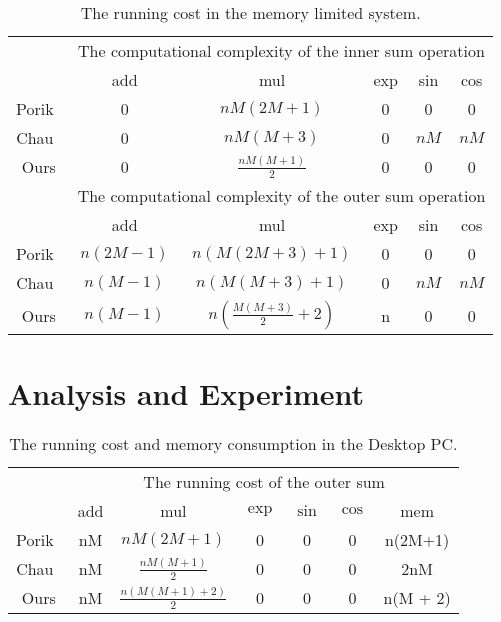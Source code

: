 \documentclass[twocolumn]{el-author}
\begin{document}
\begin{table}[t]
\caption{The running cost in the memory limited system.}
\begin{tabular}{|c|c|c|c|c|c|}
\hline
\multirow{2}{*}{} & \multicolumn{5}{c|}{The computational complexity of the inner sum operation} \\ \cline{2-6}
                  & add            & mul                         & exp     & sin      & cos      \\ \hline
Porik~\cite{Porikli_CVPR_2008}           & 0              & $nM(2M + 1)$                & 0       & 0        & 0        \\ \hline
Chau~\cite{Chaudhury_TIP_2011}         & 0              & $nM(M + 3)$                 & 0       & $nM$     & $nM$     \\ \hline
Ours              & 0              & $\frac{n M (M+1)}{2}$       & 0       & 0        & 0        \\ \hline
\multirow{2}{*}{} & \multicolumn{5}{c|}{The computational complexity of the outer sum operation} \\ \cline{2-6}
                  & add            & mul                         & exp     & sin      & cos      \\ \hline
Porik~\cite{Porikli_CVPR_2008}           & $n(2M-1)$      & $n(M(2M+3)+1)$              & 0       & 0        & 0        \\ \hline
Chau~\cite{Chaudhury_TIP_2011}        & $n(M-1)$       & $n(M(M+3)+1)$               & 0       & $nM$     & $nM$     \\ \hline
Ours              & $n(M-1)$       & $n(\frac{M(M+3)}{2}+2)$     & n       & 0        & 0        \\ \hline
\end{tabular}
\label{tab:limited}
\vspace{-0.3cm}
\end{table}


\section{Analysis and Experiment }

\begin{table}[b]
\vspace{-0.2cm}
\caption{The running cost and memory consumption in the Desktop PC.}
\begin{tabular}{|c|c|c|c|c|c|c|}
\hline
\multirow{2}{*}{} & \multicolumn{6}{c|}{The running cost of the outer sum}                               \\ \cline{2-7}
                  & add & mul                   & $\exp$ & $\sin$ & $\cos$ & mem \\ \hline
Porik~\cite{Porikli_CVPR_2008}           & nM & $n M (2M+1)$          & 0      & 0      & 0      &  n(2M+1)   \\ \hline
Chau~\cite{Chaudhury_TIP_2011}         & nM & $\frac{n M (M+1)}{2}$ & 0      & 0      & 0      &   2nM  \\ \hline
Ours              & nM & $\frac{n (M (M+1)+2)}{2}$ & 0      & 0      & 0      &   n(M + 2)  \\ \hline
\end{tabular}
\label{Tab:PC}
\end{table}
\end{document}
